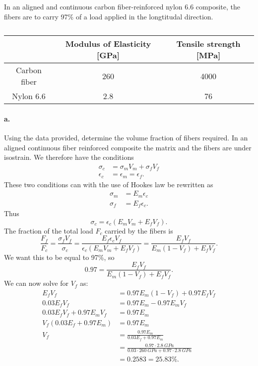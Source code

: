  In an aligned and continuous carbon fiber-reinforced nylon \num{6,6} composite, the fibers are to carry 97\% of a load applied in the longtitudal direction.
\begin{table}[ht]
\centering
\caption{}
\begin{tabular}{c|c|c}
 & \textbf{Modulus of Elasticity} [\unit{GPa}] & \textbf{Tensile strength [\unit{MPa}]} \\ \hline
  Carbon fiber & 260 & 4000 \\
  Nylon \num{6,6} & \num{2,8} & \num{76} 
\end{tabular}
\end{table}

\paragraph{a.} Using the data provided, determine the volume fraction of fibers required.
\bigbreak
In an aligned continuous fiber reinforced composite the matrix and the fibers are under isostrain. We therefore have the conditions
\begin{align*}
  \sigma_c &= \sigma_m V_m + \sigma_f V_f \\
  \epsilon_c &= \epsilon_m = \epsilon_f
.\end{align*}
These two conditions can with the use of Hookes law be rewritten as
\begin{align*}
  \sigma_m &= E_m \epsilon_c \\
  \sigma_f &= E_f \epsilon_c
.\end{align*}
Thus
\[ 
\sigma_c = \epsilon_c \left( E_m V_m + E_f V_f \right)
.\]
The fraction of the total load $F_c$ carried by the fibers is
\[ 
\frac{F_f}{F_c} = \frac{\sigma_f V_f}{\sigma_c} = \frac{E_f \epsilon_c V_f}{\epsilon_c \left( E_m V_m + E_f V_f \right)} = \frac{E_f V_f}{E_m \left( 1- V_f \right) + E_f V_f}
.\]
We want this to be equal to 97\%, so
\[ 
\num{0,97} = \frac{E_f V_f}{E_m \left( 1- V_f \right) + E_f V_f}
.\]
We can now solve for $V_f$ as:
\begin{align*}
  E_f V_f &= \num{0,97} E_m \left( 1 - V_f \right) + \num{0,97} E_f V_f \\
  \num{0,03}  E_f V_f &= \num{0,97} E_m - \num{0,97} E_m V_f \\
  \num{0,03} E_f V_f + \num{0,97} E_m V_f &= \num{0,97} E_m \\
  V_f \left( \num{0,03} E_f + \num{0,97} E_m \right) &= \num{0,97} E_m \\
  V_f &= \frac{\num{0,97} E_m}{\num{0,03} E_f + \num{0,97} E_m} \\
  &= \frac{\num{0,97} \cdot \qty{2,8}{GPa}}{\num{0,03} \cdot \qty{260}{GPa} + \num{0,97} \cdot \qty{2,8}{GPa} } \\
  &= \num{0,2583} = \num{25,83} \% 
.\end{align*}


